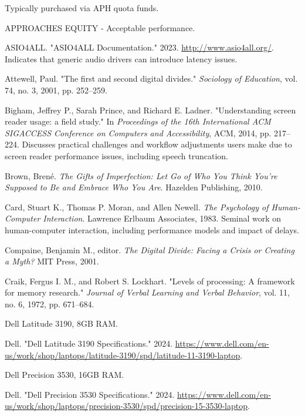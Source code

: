 \begin{thebibliography}{99}
Typically purchased via APH quota funds.

APPROACHES EQUITY - Acceptable performance.

ASIO4ALL. "ASIO4ALL Documentation." 2023. \url{http://www.asio4all.org/}. Indicates that generic audio drivers can introduce latency issues.

Attewell, Paul. "The first and second digital divides." \emph{Sociology of Education}, vol. 74, no. 3, 2001, pp. 252--259.

Bigham, Jeffrey P., Sarah Prince, and Richard E. Ladner. "Understanding screen reader usage: a field study." In \emph{Proceedings of the 16th International ACM SIGACCESS Conference on Computers and Accessibility}, ACM, 2014, pp. 217--224. Discusses practical challenges and workflow adjustments users make due to screen reader performance issues, including speech truncation.

Brown, Brené. \emph{The Gifts of Imperfection: Let Go of Who You Think You're Supposed to Be and Embrace Who You Are}. Hazelden Publishing, 2010.

Card, Stuart K., Thomas P. Moran, and Allen Newell. \emph{The Psychology of Human-Computer Interaction}. Lawrence Erlbaum Associates, 1983. Seminal work on human-computer interaction, including performance models and impact of delays.

Compaine, Benjamin M., editor. \emph{The Digital Divide: Facing a Crisis or Creating a Myth?} MIT Press, 2001.

Craik, Fergus I. M., and Robert S. Lockhart. "Levels of processing: A framework for memory research." \emph{Journal of Verbal Learning and Verbal Behavior}, vol. 11, no. 6, 1972, pp. 671--684.

Dell Latitude 3190, 8GB RAM.

Dell. "Dell Latitude 3190 Specifications." 2024. \url{https://www.dell.com/en-us/work/shop/laptops/latitude-3190/spd/latitude-11-3190-laptop}.

Dell Precision 3530, 16GB RAM.

Dell. "Dell Precision 3530 Specifications." 2024. \url{https://www.dell.com/en-us/work/shop/laptops/precision-3530/spd/precision-15-3530-laptop}.


\end{thebibliography}
